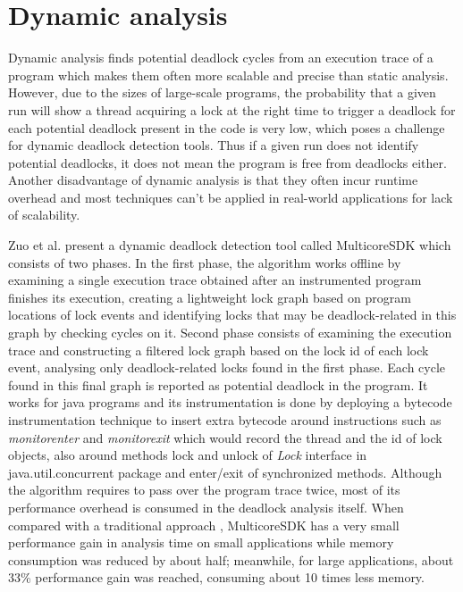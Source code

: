 \section{Dynamic analysis}

Dynamic analysis finds potential deadlock cycles from an execution trace of a program which makes them often more scalable and precise than static analysis.
However, due to the sizes of large-scale programs, the probability that a given run will show a thread acquiring a lock at the right time to trigger a deadlock for
each potential deadlock present in the code is very low, which poses a challenge for dynamic deadlock detection tools. Thus if a given run does not identify potential
deadlocks, it does not mean the program is free from deadlocks either. Another disadvantage of dynamic analysis is that they often incur runtime overhead and most techniques
can't be applied in real-world applications for lack of scalability.

Zuo et al. \cite{mcsdk} present a dynamic deadlock detection tool called MulticoreSDK which consists of two phases.
In the first phase, the algorithm works offline by examining a single execution trace obtained after an instrumented program finishes its execution,
creating a lightweight lock graph based on program locations of lock events and identifying locks that may be deadlock-related in this graph by checking cycles on it.
Second phase consists of examining the execution trace and constructing a filtered lock graph based on the lock id of each lock event, analysing only deadlock-related locks
found in the first phase. Each cycle found in this final graph is reported as potential deadlock in the program.
It works for java programs and its instrumentation is done by deploying a bytecode instrumentation technique \cite{tanter} to insert extra bytecode
around instructions such as \emph{monitorenter} and \emph{monitorexit} which would record the thread and the id of lock objects, also around methods lock and unlock of
\emph{Lock} interface in java.util.concurrent package and enter/exit of synchronized methods.
Although the algorithm requires to pass over the program trace twice, most of its performance overhead is consumed in the deadlock analysis itself.
When compared with a traditional approach \cite{contest}, MulticoreSDK has a very small performance gain in analysis time on small applications while memory consumption
was reduced by about half; meanwhile, for large applications, about 33\% performance gain was reached, consuming about 10 times less memory.

